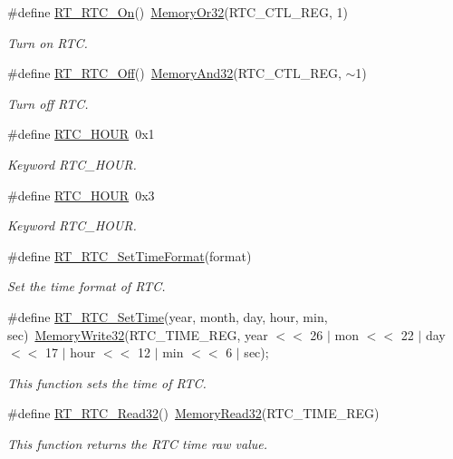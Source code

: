\begin{DoxyCompactItemize}
\item 
\#define \mbox{\hyperlink{a00053_abcec88fd1699e238435a90f1b49f01fc}{R\+T\+\_\+\+R\+T\+C\+\_\+\+On}}()~\mbox{\hyperlink{a00020_a27874a97deab7cecdde5ddecf466e31e}{Memory\+Or32}}(R\+T\+C\+\_\+\+C\+T\+L\+\_\+\+R\+EG, 1)
\begin{DoxyCompactList}\small\item\em Turn on R\+TC. \end{DoxyCompactList}\item 
\#define \mbox{\hyperlink{a00053_ad065bdfa3138a773950a7d5e9e9f863a}{R\+T\+\_\+\+R\+T\+C\+\_\+\+Off}}()~\mbox{\hyperlink{a00020_ad87cedffcaadc51db22594fce55173d4}{Memory\+And32}}(R\+T\+C\+\_\+\+C\+T\+L\+\_\+\+R\+EG, $\sim$1)
\begin{DoxyCompactList}\small\item\em Turn off R\+TC. \end{DoxyCompactList}\item 
\#define \mbox{\hyperlink{a00053_a6023ebffc90fff4ba8131242c8f4e1ed}{R\+T\+C\+\_\+H\+O\+UR}}~0x1
\begin{DoxyCompactList}\small\item\em Keyword R\+T\+C\+\_\+H\+O\+UR. \end{DoxyCompactList}\item 
\#define \mbox{\hyperlink{a00053_a4bb66ada65a9c9df51dd50402f75e35e}{R\+T\+C\+\_\+H\+O\+UR}}~0x3
\begin{DoxyCompactList}\small\item\em Keyword R\+T\+C\+\_\+H\+O\+UR. \end{DoxyCompactList}\item 
\#define \mbox{\hyperlink{a00053_a4342706ea208fe0adff35bfa3c78b87c}{R\+T\+\_\+\+R\+T\+C\+\_\+\+Set\+Time\+Format}}(format)
\begin{DoxyCompactList}\small\item\em Set the time format of R\+TC. \end{DoxyCompactList}\item 
\#define \mbox{\hyperlink{a00053_a8929da3f9ad422dd07f18d603c63b7b7}{R\+T\+\_\+\+R\+T\+C\+\_\+\+Set\+Time}}(year,  month,  day,  hour,  min,  sec)~\mbox{\hyperlink{a00020_a6b9732365b12e48ddb89fe1028b975b0}{Memory\+Write32}}(R\+T\+C\+\_\+\+T\+I\+M\+E\+\_\+\+R\+EG, year $<$$<$ 26 $\vert$ mon $<$$<$ 22 $\vert$ day $<$$<$ 17 $\vert$ hour $<$$<$ 12 $\vert$ min $<$$<$ 6 $\vert$ sec);
\begin{DoxyCompactList}\small\item\em This function sets the time of R\+TC. \end{DoxyCompactList}\item 
\#define \mbox{\hyperlink{a00053_a61ac395d30cde55137bf04acaec570f0}{R\+T\+\_\+\+R\+T\+C\+\_\+\+Read32}}()~\mbox{\hyperlink{a00020_a2d484dc15bdf30ee11ab3b05f31f0e16}{Memory\+Read32}}(R\+T\+C\+\_\+\+T\+I\+M\+E\+\_\+\+R\+EG)
\begin{DoxyCompactList}\small\item\em This function returns the R\+TC time raw value. \end{DoxyCompactList}\end{DoxyCompactItemize}
